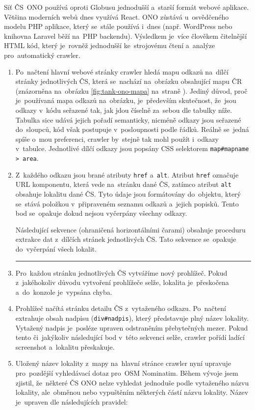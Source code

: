 Síť ČS~ONO používá oproti Globusu jednodušší a~starší formát webové aplikace.
Většina moderních webů dnes využívá React. ONO zůstává u~osvědčeného modelu
PHP aplikace, který se~stále používá i~dnes (např. WordPress nebo knihovna
Laravel běží na~PHP backendu). Výsledkem je~více člověkem čitelnější HTML
kód, který je~rovněž jednodušší ke~strojovému čtení a~analýze pro~automatický
crawler.

\begin{enumerate}
    \item Po~načtení hlavní webové stránky crawler hledá mapu odkazů
        na~dílčí stránky jednotlivých ČS, která se~nachází na~obrázku
        obsahující mapu ČR (znázorněna na~obrázku \ref{fig:tank-ono-mapa}
        na~straně \pageref{fig:tank-ono-mapa}). Jediný důvod, proč
        je~používaná mapa odkazů na~obrázku, je~především skutečnost,
        že~jsou odkazy v~kódu seřazené tak, jak jdou číselně za~sebou
        dle tabulky níže. Tabulka sice udává jejich pořadí semanticky,
        nicméně odkazy jsou seřazené do~sloupců, kód však postupuje
        v~posloupnosti podle řádků. Reálně se~jedná spíše o~mou preferenci,
        crawler by~stejně tak mohl použít i~odkazy v~tabulce. Jednotlivé
        dílčí odkazy jsou popsány CSS selektorem
        \texttt{map\#mapname > area}.
    \item Z~každého odkazu jsou brané atributy \texttt{href} a~\texttt{alt}.
        Atribut \texttt{href} označuje URL komponentu, která vede na~stránku
        dané ČS, zatímco atribut \texttt{alt} obsahuje lokalitu dané ČS.
        Tyto údaje jsou formátovány do~objektu, který se~stává položkou
        v~připraveném seznamu odkazů a~jejich popisků. Tento bod se~opakuje
        dokud nejsou vyčerpány všechny odkazy.

        Následující sekvence (ohraničená horizontálními čarami) obsahuje
        proceduru extrakce dat z~dílčích stránek jednotlivých ČS. Tato
        sekvence se~opakuje do~vyčerpání všech lokalit.
        \hrule
    \item Pro~každou stránku jednotlivých ČS vytváříme nový prohlížeč.
        Pokud z~jakéhokoliv důvodu vytvoření prohlížeče selže, lokalita
        je~přeskočena a~do~konzole je~vypsána chyba.
    \item Prohlížeč načítá stránku detailu ČS z~vytaženého odkazu.
        Po~načtení extrahuje obsah nadpisu (\texttt{div\#nadpis}), který
        představuje plný název lokality. Vytažený nadpis je~posléze upraven
        odstraněním přebytečných mezer. Pokud tento či~jakýkoliv následující
        bod v~této sekvenci selže, crawler pořídí ladící screenshot
        a~lokalitu přeskakuje.
    \item Uložený název lokality z~mapy na~hlavní stránce crawler
        nyní upravuje pro~pozdější vyhledávací dotaz pro~OSM Nominatim.
        Během vývoje jsem zjistil, že~některé ČS ONO nelze vyhledat jednoduše
        podle vytaženého názvu lokality, ale~obměnou nebo vypuštěním některých
        částí názvu lokality. Název je~upraven dle následujících pravidel:


\end{enumerate}
